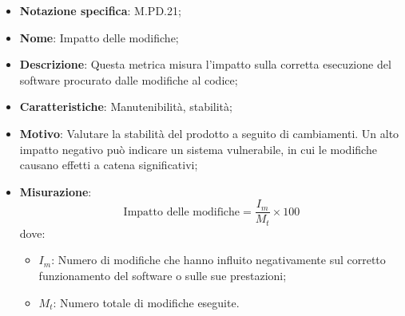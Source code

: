 \begin{itemize}
    \item \textbf{Notazione specifica}: M.PD.21;
    \item \textbf{Nome}: Impatto delle modifiche;
    \item \textbf{Descrizione}: Questa metrica misura l'impatto sulla corretta esecuzione del software procurato dalle modifiche al codice;
    \item \textbf{Caratteristiche}: Manutenibilità, stabilità;
    \item \textbf{Motivo}: Valutare la stabilità del prodotto a seguito di cambiamenti. Un alto impatto negativo può indicare un sistema vulnerabile, in cui le modifiche causano effetti a catena significativi;
    \item \textbf{Misurazione}: 
    \[
    \text{Impatto delle modifiche} = \frac{I_{m}}{M_{t}} \times 100
    \]
    dove:
    \begin{itemize}
        \item $I_{m}$: Numero di modifiche che hanno influito negativamente sul corretto funzionamento del software o sulle sue prestazioni;
        \item $M_{t}$: Numero totale di modifiche eseguite.
    \end{itemize}
\end{itemize}
